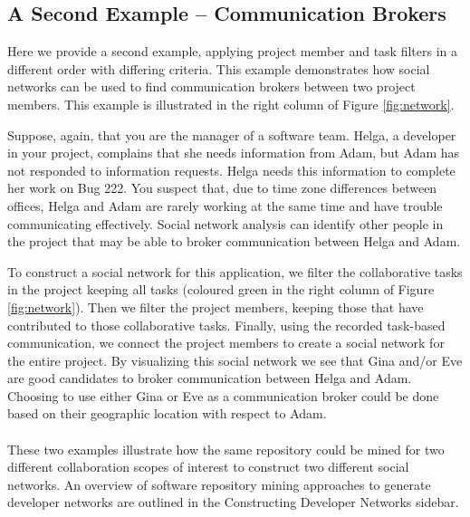 \documentclass[12pt,oneside]{book}
\begin{document}
\subsection{A Second Example -- Communication Brokers}
Here we provide a second example, applying project member and task filters in a
different order with differing criteria. This example demonstrates how social
networks can be used to find communication brokers between two project members.
This example is illustrated in the right column of Figure \ref{fig:network}.

Suppose, again, that you are the manager of a software team. Helga, a developer
in your project, complains that she needs information from Adam, but Adam has not
responded to information requests. Helga needs this information to complete her
work on Bug 222. You suspect that, due to time zone differences between
offices, Helga and Adam are rarely working at the same time and have trouble
communicating effectively. Social network analysis can identify other people in
the project that may be able to broker communication between Helga and Adam.

To construct a social network for this application, we filter the collaborative
tasks in the project keeping all tasks (coloured green in the right column of
Figure \ref{fig:network}). Then we filter the project members, keeping those that
have contributed to those collaborative tasks. Finally, using the recorded
task-based communication, we connect the project members to create a social
network for the entire project. By visualizing this social network we see that
Gina and/or Eve are good candidates to broker communication between Helga and
Adam. Choosing to use either Gina or Eve as a communication broker could be done
based on their geographic location with respect to Adam.

\paragraph{}
These two examples illustrate how the same repository could be mined for two
different collaboration scopes of interest to construct two different social
networks. An overview of software repository mining approaches to generate
developer networks are outlined in the Constructing Developer Networks sidebar.
\end{document}
